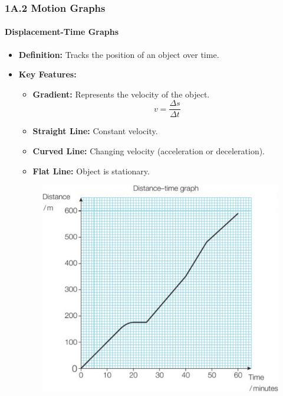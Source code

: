 
\subsubsection{1A.2 Motion Graphs}
\paragraph{Displacement-Time Graphs}
\begin{itemize}
    \item \textbf{Definition:} Tracks the position of an object over time.
    \item \textbf{Key Features:}
    \begin{itemize}
        \item \textbf{Gradient:} Represents the velocity of the object.
        \begin{equation}
            v = \frac{\Delta s}{\Delta t}
        \end{equation}
        \item \textbf{Straight Line:} Constant velocity.
        \item \textbf{Curved Line:} Changing velocity (acceleration or deceleration).
        \item \textbf{Flat Line:} Object is stationary.
    \end{itemize}
    \begin{figure}[H]
        \centering
        \includegraphics[scale=0.15]{Physics/1A/Images/1A-2-1.png}
    \end{figure}
\end{itemize}

